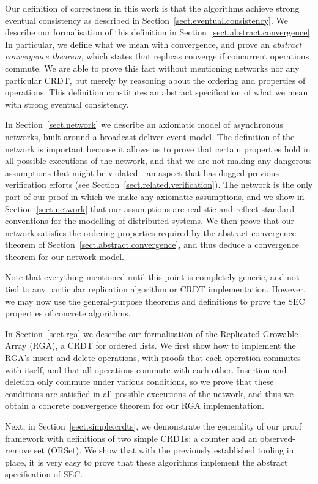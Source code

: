 Our definition of correctness in this work is that the algorithms achieve strong eventual consistency as described in Section~\ref{sect.eventual.consistency}.
We describe our formalisation of this definition in Section~\ref{sect.abstract.convergence}.
In particular, we define what we mean with convergence, and prove an \emph{abstract convergence theorem}, which states that replicas converge if concurrent operations commute.
We are able to prove this fact without mentioning networks nor any particular CRDT, but merely by reasoning about the ordering and properties of operations.
This definition constitutes an abstract specification of what we mean with strong eventual consistency.

In Section~\ref{sect.network} we describe an axiomatic model of asynchronous networks, built around a broadcast-deliver event model.
The definition of the network is important because it allows us to prove that certain properties hold in all possible executions of the network, and that we are not making any dangerous assumptions that might be violated---an aspect that has dogged previous verification efforts (see Section~\ref{sect.related.verification}).
The network is the only part of our proof in which we make any axiomatic assumptions, and we show in Section~\ref{sect.network} that our assumptions are realistic and reflect standard conventions for the modelling of distributed systems.
We then prove that our network satisfies the ordering properties required by the abstract convergence theorem of Section~\ref{sect.abstract.convergence}, and thus deduce a convergence theorem for our network model.

Note that everything mentioned until this point is completely generic, and not tied to any particular replication algorithm or CRDT implementation.
However, we may now use the general-purpose theorems and definitions to prove the SEC properties of concrete algorithms.

In Section~\ref{sect.rga} we describe our formalisation of the Replicated Growable Array (RGA), a CRDT for ordered lists.
We first show how to implement the RGA's insert and delete operations, with proofs that each operation commutes with itself, and that all operations commute with each other.
Insertion and deletion only commute under various conditions, so we prove that these conditions are satisfied in all possible executions of the network, and thus we obtain a concrete convergence theorem for our RGA implementation.

Next, in Section~\ref{sect.simple.crdts}, we demonstrate the generality of our proof framework with definitions of two simple CRDTs: a counter and an observed-remove set (ORSet).
We show that with the previously established tooling in place, it is very easy to prove that these algorithms implement the abstract specification of SEC.


